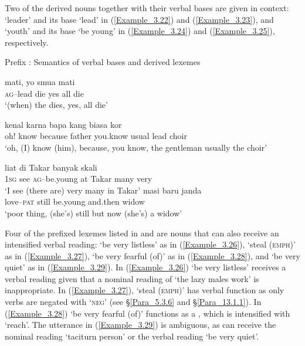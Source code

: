 Two of the derived nouns together with their verbal bases are given in context:  ‘leader’ and its  base  ‘lead’ in (\ref{Example_3.22}) and (\ref{Example_3.23}), and  ‘youth’ and its  base  ‘be young’ in (\ref{Example_3.24}) and (\ref{Example_3.25}), respectively.



\begin{styleExampleTitle}
{Prefix : Semantics of verbal bases and derived lexemes}
\end{styleExampleTitle}
\ea
\label{Example_3.22}
 {mati,} {yo} {smua} {mati}\\ %
   \textsc{ag}–lead  die  yes  all  die\\
\glt 
‘(when) the  dies, yes, all die’ \textstyleExampleSource{[081010-001-Cv.0026]}
\z

\ea
\label{Example_3.23}
 {kenal} {karna} {bapa} {kang} {biasa} {} {kor}\\ %
 oh!  know  because  father  you.know  usual  lead  choir\\
\glt 
‘oh, (I) know (him), because, you know, the gentleman usually  the choir’ \textstyleExampleSource{[081011-022-Cv.0243]}
\z

\ea
\label{Example_3.24}
 {liat} {} {di} {Takar} {banyak} {skali}\\ %
 \textsc{1sg}  see  \textsc{ag}–be.young  at  Takar  many  very\\
\glt 
‘I see (there are) very many  in Takar’ \textstyleExampleSource{[080925-003-Cv.0176]}
\z
\ea
\label{Example_3.25}
 {masi} {} {baru} {janda}\\ %
 love–\textsc{pat}  still  be.young  and.then  widow\\
\glt 
‘poor thing, (she’s) still  but now (she’s) a widow’ \textstyleExampleSource{[081006-015-Cv.0032]}
\z


Four of the prefixed lexemes listed in  and  are nouns that can also receive an intensified verbal reading:  ‘be very listless’ as in (\ref{Example_3.26}),  ‘steal (\textsc{emph})’ as in (\ref{Example_3.27}),  ‘be very fearful (of)’ as in (\ref{Example_3.28}), and  ‘be very quiet’ as in (\ref{Example_3.29}). In (\ref{Example_3.26})  ‘be very listless’ receives a verbal reading given that a nominal reading of  ‘the lazy males work’ is inappropriate. In (\ref{Example_3.27}),  ‘steal (\textsc{emph})’ has verbal function as only verbs are negated with  ‘\textsc{neg}’ (see §\ref{Para_5.3.6} and §\ref{Para_13.1.1}). In (\ref{Example_3.28})  ‘be very fearful (of)’ functions as a , which is intensified with  ‘reach’. The utterance in (\ref{Example_3.29}) is ambiguous, as  can receive the nominal reading ‘taciturn person’ or the verbal reading ‘be very quiet’.


